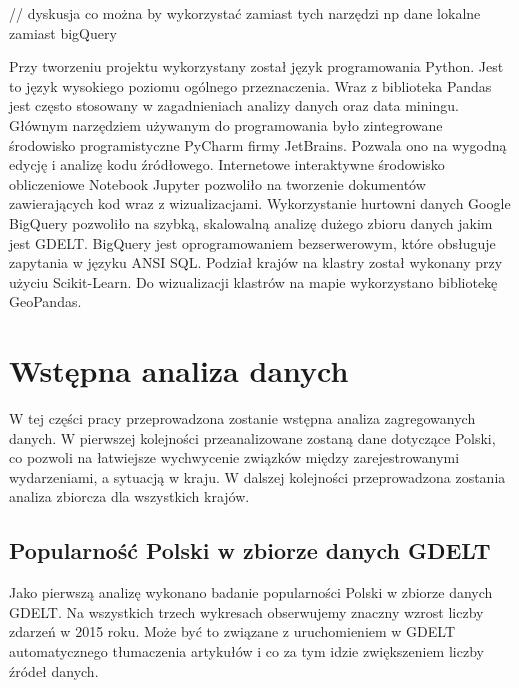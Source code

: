 \documentclass[11pt]{report}
\begin{document}
    // dyskusja co można by wykorzystać zamiast tych narzędzi np dane lokalne zamiast bigQuery

    Przy tworzeniu projektu wykorzystany został język programowania Python.
    Jest to język wysokiego poziomu ogólnego przeznaczenia.
    Wraz z biblioteka Pandas jest często stosowany w zagadnieniach analizy danych oraz data miningu.
    Głównym narzędziem używanym do programowania było zintegrowane środowisko programistyczne PyCharm firmy JetBrains.
    Pozwala ono na wygodną edycję i analizę kodu źródłowego.
    Internetowe interaktywne środowisko obliczeniowe Notebook Jupyter pozwoliło na tworzenie dokumentów zawierających kod wraz z wizualizacjami.
    Wykorzystanie hurtowni danych Google BigQuery pozwoliło na szybką, skalowalną analizę dużego zbioru danych jakim jest GDELT.
    BigQuery jest oprogramowaniem bezserwerowym, które obsługuje zapytania w języku ANSI SQL.
    Podział krajów na klastry został wykonany przy użyciu Scikit-Learn.
    Do wizualizacji klastrów na mapie wykorzystano bibliotekę GeoPandas.


    \chapter{Wstępna analiza danych}
    W tej części pracy przeprowadzona zostanie wstępna analiza zagregowanych danych. W pierwszej kolejności przeanalizowane zostaną dane dotyczące Polski, co pozwoli na łatwiejsze wychwycenie związków między zarejestrowanymi wydarzeniami, a sytuacją w kraju.
    W dalszej kolejności przeprowadzona zostania analiza zbiorcza dla wszystkich krajów.


    \section{Popularność Polski w zbiorze danych GDELT}
    Jako pierwszą analizę wykonano badanie popularności Polski w zbiorze danych GDELT. Na wszystkich trzech wykresach obserwujemy znaczny wzrost liczby zdarzeń w 2015 roku. Może być to związane z uruchomieniem w GDELT automatycznego tłumaczenia artykułów i co za tym idzie zwiększeniem liczby źródeł danych.
\end{document}
